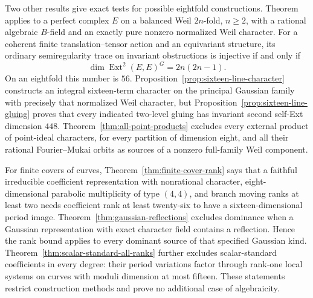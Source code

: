 \documentclass[11pt]{article}
\theoremstyle{definition}
\theoremstyle{remark}
\begin{document}
Two other results give exact tests for possible eightfold constructions. Theorem~ applies to a perfect complex $E$ on a balanced Weil $2n$-fold, $n\ge2$, with a rational algebraic $B$-field and an exactly pure nonzero normalized Weil character. For a coherent finite translation--tensor action and an equivariant structure, its ordinary semiregularity trace on invariant obstructions is injective if and only if
\[
 \dim\operatorname{Ext}^2(E,E)^G=2n(2n-1).
\]
On an eightfold this number is $56$. Proposition~\ref{prop:sixteen-line-character} constructs an integral sixteen-term character on the principal Gaussian family with precisely that normalized Weil character, but Proposition~\ref{prop:sixteen-line-gluing} proves that every indicated two-level gluing has invariant second self-Ext dimension $448$. Theorem~\ref{thm:all-point-products} excludes every external product of point-ideal characters, for every partition of dimension eight, and all their rational Fourier--Mukai orbits as sources of a nonzero full-family Weil component.

For finite covers of curves, Theorem~\ref{thm:finite-cover-rank} says that a faithful irreducible coefficient representation with nonrational character, eight-dimensional parabolic multiplicity of type $(4,4)$, and branch moving ranks at least two needs coefficient rank at least twenty-six to have a sixteen-dimensional period image. Theorem~\ref{thm:gaussian-reflections} excludes dominance when a Gaussian representation with exact character field contains a reflection. Hence the rank bound applies to every dominant source of that specified Gaussian kind. Theorem~\ref{thm:scalar-standard-all-ranks} further excludes scalar-standard coefficients in every degree: their period variations factor through rank-one local systems on curves with moduli dimension at most fifteen. These statements restrict construction methods and prove no additional case of algebraicity.
\end{document}
